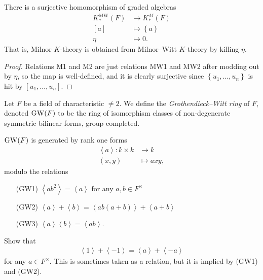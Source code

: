 \documentclass[11pt,openany]{book}
\providecommand{\MW}{\mathrm{MW}}
\begin{document}
\begin{proposition} There is a surjective homomorphism of graded algebras
\begin{align*}
    K_\ast^\MW(F) &\to K_\ast^M(F) \\
    [a] &\mapsto \left\{ a \right\} \\
    \eta &\mapsto 0.
\end{align*}
That is, Milnor $K$-theory is obtained from Milnor--Witt $K$-theory by killing $\eta$.
\end{proposition}
\begin{proof} Relations M1 and M2 are just relations MW1 and MW2 after modding out by $\eta$, so the map is well-defined, and it is clearly surjective since $\left\{ u_1, \ldots, u_n \right\}$ is hit by $ [u_1, \ldots, u_n]$.
\end{proof}


\begin{definition} Let $F$ be a field of characteristic $\ne 2$. We define the \textit{Grothendieck--Witt ring} of $F$, denoted $\mathrm{GW}(F)$ to be the ring of isomorphism classes of non-degenerate symmetric bilinear forms, group completed.
\end{definition}

\begin{proposition} $\mathrm{GW}(F)$ is generated by rank one forms
\begin{align*}
    \left\langle a \right\rangle \colon k \times k &\to k \\
    (x,y) &\mapsto axy,
\end{align*}
modulo the relations
\begin{enumerate}
    \item[(GW1)] $\left\langle ab^2 \right\rangle = \left\langle a \right\rangle$ for any $a,b\in F^\times$
     \item[(GW2)] $\left\langle a \right\rangle + \left\langle b \right\rangle = \left\langle ab(a+b) \right\rangle + \left\langle a+b \right\rangle$
     \item[(GW3)] $\left\langle a \right\rangle \left\langle b \right\rangle = \left\langle ab \right\rangle$.
\end{enumerate}
\end{proposition}

\begin{exercise} Show that
\begin{align*}
    \left\langle 1 \right\rangle + \left\langle -1 \right\rangle = \left\langle a \right\rangle + \left\langle -a \right\rangle
\end{align*}
for any $a\in F^\times$. This is sometimes taken as a relation, but it is implied by (GW1) and (GW2).
\end{exercise}
\end{document}
